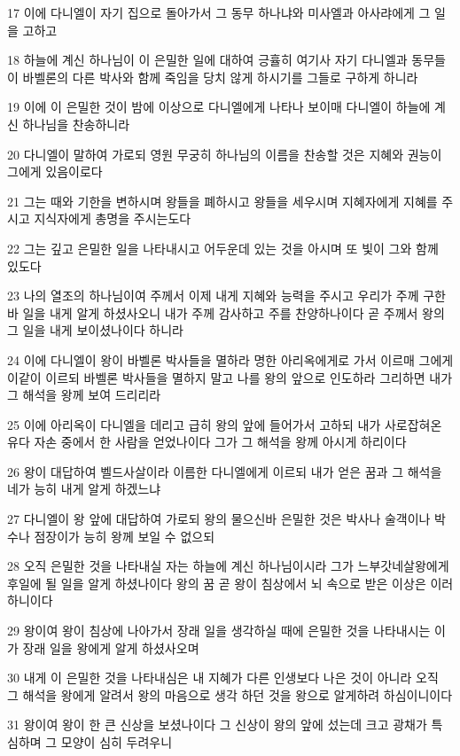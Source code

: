 \par 17 이에 다니엘이 자기 집으로 돌아가서 그 동무 하나냐와 미사엘과 아사랴에게 그 일을 고하고
\par 18 하늘에 계신 하나님이 이 은밀한 일에 대하여 긍휼히 여기사 자기 다니엘과 동무들이 바벨론의 다른 박사와 함께 죽임을 당치 않게 하시기를 그들로 구하게 하니라
\par 19 이에 이 은밀한 것이 밤에 이상으로 다니엘에게 나타나 보이매 다니엘이 하늘에 계신 하나님을 찬송하니라
\par 20 다니엘이 말하여 가로되 영원 무궁히 하나님의 이름을 찬송할 것은 지혜와 권능이 그에게 있음이로다
\par 21 그는 때와 기한을 변하시며 왕들을 폐하시고 왕들을 세우시며 지혜자에게 지혜를 주시고 지식자에게 총명을 주시는도다
\par 22 그는 깊고 은밀한 일을 나타내시고 어두운데 있는 것을 아시며 또 빛이 그와 함께 있도다
\par 23 나의 열조의 하나님이여 주께서 이제 내게 지혜와 능력을 주시고 우리가 주께 구한바 일을 내게 알게 하셨사오니 내가 주께 감사하고 주를 찬양하나이다 곧 주께서 왕의 그 일을 내게 보이셨나이다 하니라
\par 24 이에 다니엘이 왕이 바벨론 박사들을 멸하라 명한 아리옥에게로 가서 이르매 그에게 이같이 이르되 바벨론 박사들을 멸하지 말고 나를 왕의 앞으로 인도하라 그리하면 내가 그 해석을 왕께 보여 드리리라
\par 25 이에 아리옥이 다니엘을 데리고 급히 왕의 앞에 들어가서 고하되 내가 사로잡혀온 유다 자손 중에서 한 사람을 얻었나이다 그가 그 해석을 왕께 아시게 하리이다
\par 26 왕이 대답하여 벨드사살이라 이름한 다니엘에게 이르되 내가 얻은 꿈과 그 해석을 네가 능히 내게 알게 하겠느냐
\par 27 다니엘이 왕 앞에 대답하여 가로되 왕의 물으신바 은밀한 것은 박사나 술객이나 박수나 점장이가 능히 왕께 보일 수 없으되
\par 28 오직 은밀한 것을 나타내실 자는 하늘에 계신 하나님이시라 그가 느부갓네살왕에게 후일에 될 일을 알게 하셨나이다 왕의 꿈 곧 왕이 침상에서 뇌 속으로 받은 이상은 이러하니이다
\par 29 왕이여 왕이 침상에 나아가서 장래 일을 생각하실 때에 은밀한 것을 나타내시는 이가 장래 일을 왕에게 알게 하셨사오며
\par 30 내게 이 은밀한 것을 나타내심은 내 지혜가 다른 인생보다 나은 것이 아니라 오직 그 해석을 왕에게 알려서 왕의 마음으로 생각 하던 것을 왕으로 알게하려 하심이니이다
\par 31 왕이여 왕이 한 큰 신상을 보셨나이다 그 신상이 왕의 앞에 섰는데 크고 광채가 특심하며 그 모양이 심히 두려우니

